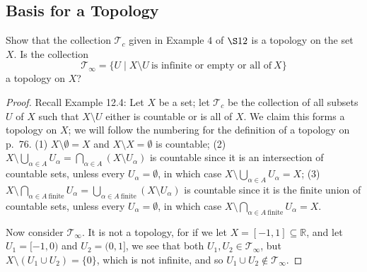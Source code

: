 \documentclass[12pt]{article}
\theoremstyle{remark}
\begin{document}
\subsection{Basis for a Topology}
\setcounter{subsubsection}{2}
\begin{problem}
  Show that the collection $\mathcal{T}_c$ given in Example $4$ of $\S12$ is a topology on the set $X$. Is the collection
  \begin{equation*}
    \mathcal{T}_\infty = \{U \mid X \setminus U~\text{is infinite or empty or all of}~X\}
  \end{equation*}
  a topology on $X$?
\end{problem}
\begin{proof}
  Recall Example 12.4: Let $X$ be a set; let $\mathcal{T}_c$ be the
  collection of all subsets $U$ of $X$ such that $X \setminus U$ either is
  countable or is all of $X$. We claim this forms a topology on $X$; we will
  follow the numbering for the definition of a topology on p.~76. (1) $X
  \setminus \emptyset = X$ and $X \setminus X = \emptyset$ is countable; (2)
  $X \setminus \bigcup_{\alpha \in A} U_\alpha = \bigcap_{\alpha \in A} (X
  \setminus U_\alpha)$ is countable since it is an intersection of countable sets,
  unless every $U_\alpha = \emptyset$, in which case $X \setminus \bigcup_{\alpha \in
  A} U_\alpha = X$; (3) $X \setminus \bigcap_{\alpha \in A~\text{finite}}
  U_\alpha = \bigcup_{\alpha \in A~\text{finite}} (X \setminus U_\alpha)$ is
  countable since it is the finite union of countable sets, unless every
  $U_\alpha = \emptyset$, in which case $X \setminus
  \bigcap_{\alpha \in A~\text{finite}} U_\alpha = X$.
  \par Now consider $\mathcal{T}_\infty$. It is not a topology, for if we let $X = [-1,1] \subseteq \mathbb{R}$, and let $U_1 = [-1,0)$ and $U_2 = (0,1]$, we see that both $U_1,U_2 \in \mathcal{T}_\infty$, but $X \setminus (U_1 \cup U_2) = \{0\}$, which is not infinite, and so $U_1 \cup U_2 \notin \mathcal{T}_\infty$.
\end{proof}
\end{document}
